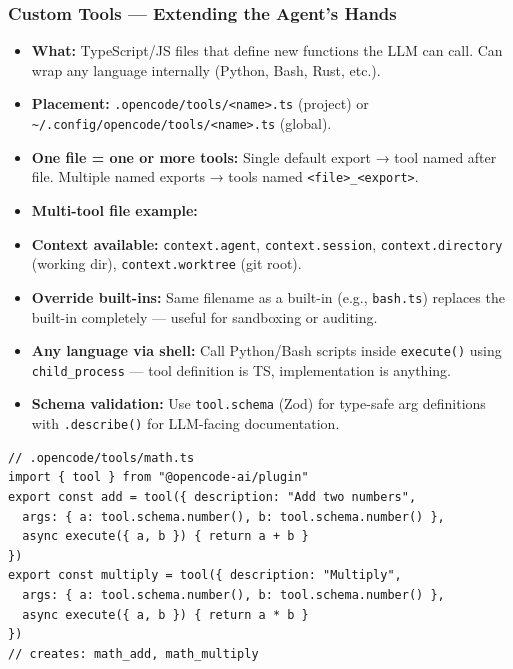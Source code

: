 \begin{frame}[fragile]\frametitle{Custom Tools — Extending the Agent's Hands}
  \begin{itemize}
    \item \textbf{What:} TypeScript/JS files that define new functions the LLM can call. Can wrap any language internally (Python, Bash, Rust, etc.).
    \item \textbf{Placement:} \texttt{.opencode/tools/<name>.ts} (project) or \texttt{\textasciitilde/.config/opencode/tools/<name>.ts} (global).
    \item \textbf{One file = one or more tools:} Single default export → tool named after file. Multiple named exports → tools named \texttt{<file>\_<export>}.
    \item \textbf{Multi-tool file example:}
    \item \textbf{Context available:} \texttt{context.agent}, \texttt{context.session}, \texttt{context.directory} (working dir), \texttt{context.worktree} (git root).
    \item \textbf{Override built-ins:} Same filename as a built-in (e.g., \texttt{bash.ts}) replaces the built-in completely — useful for sandboxing or auditing.
    \item \textbf{Any language via shell:} Call Python/Bash scripts inside \texttt{execute()} using \texttt{child\_process} — tool definition is TS, implementation is anything.
    \item \textbf{Schema validation:} Use \texttt{tool.schema} (Zod) for type-safe arg definitions with \texttt{.describe()} for LLM-facing documentation.
  \end{itemize}
  
\begin{lstlisting}
// .opencode/tools/math.ts
import { tool } from "@opencode-ai/plugin"
export const add = tool({ description: "Add two numbers",
  args: { a: tool.schema.number(), b: tool.schema.number() },
  async execute({ a, b }) { return a + b }
})
export const multiply = tool({ description: "Multiply",
  args: { a: tool.schema.number(), b: tool.schema.number() },
  async execute({ a, b }) { return a * b }
})
// creates: math_add, math_multiply
\end{lstlisting}  
\end{frame}

